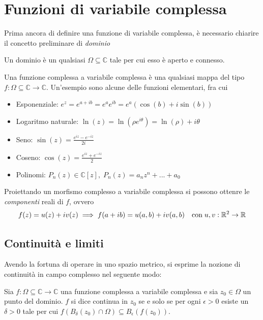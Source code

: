 \section{Funzioni di variabile complessa}
    Prima ancora di definire una funzione di variabile complessa, è necessario chiarire il concetto preliminare di \textit{dominio}
    \begin{definition}
        Un dominio è un qualsiasi $\Omega \subseteq \mathbb{C}$ tale per cui esso è aperto e connesso.
    \end{definition}

    Una funzione complessa a variabile complessa è una qualsiasi mappa del tipo $f: \Omega \subseteq \mathbb{C} \rightarrow \mathbb{C}$.
    Un'esempio sono alcune delle funzioni elementari, fra cui

    \begin{itemize}
        \item Esponenziale: $e^{z} = e^{a + ib} = e^{a}e^{ib} = e^{a}(\cos(b) + i \sin(b))$
        \item Logaritmo naturale: $\ln(z) = \ln(\rho e^{i \theta}) = \ln(\rho) + i\theta$
        \item Seno: $\sin(z) = \displaystyle \frac{e^{iz} - e^{-iz}}{2i}$
        \item Coseno: $\cos(z) = \displaystyle \frac{e^{iz} + e^{-iz}}{2}$
        \item Polinomi: $P_{n}(z) \in \mathbb{C}[z], \; P_{n}(z) = a_{n} z^{n} + ... + a_{0}$
    \end{itemize}

    Proiettando un morfismo complesso a variabile complessa si possono ottenre le \textit{componenti} reali di $f$, ovvero
    \[
        f(z) = u(z) + i v(z) \implies f(a + i b) = u(a, b) + iv(a, b) \quad \textnormal{con} \; u, v : \mathbb{R}^{2} \rightarrow \mathbb{R}
    \]

    \subsection{Continuità e limiti}
        Avendo la fortuna di operare in uno spazio metrico, si esprime la nozione di continuità in campo complesso nel seguente modo:

        \begin{definition}
            Sia $f: \Omega \subseteq \mathbb{C} \rightarrow \mathbb{C}$ una funzione complessa a variabile complessa e sia $z_{0} \in \Omega$ un punto del dominio.
            $f$ si dice continua in $z_{0}$ se e solo se per ogni $\epsilon > 0$ esiste un $\delta > 0$ tale per cui $f(B_{\delta}(z_{0}) \cap \Omega) \subseteq B_{\epsilon}(f(z_{0}))$.
        \end{definition}

